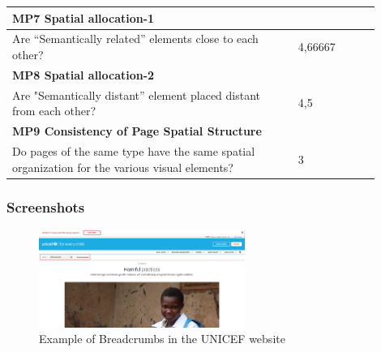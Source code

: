 \begin{longtable}{|p{0.7\linewidth}|p{0.2\linewidth}|}
\multicolumn{2}{|l|}{\textbf{MP7 Spatial allocation-1}} \\
\hline
Are “Semantically related” elements close to each other? & 4,66667  \\
\hline

\multicolumn{2}{|l|}{\textbf{MP8 Spatial allocation-2}} \\
\hline
Are "Semantically distant” element placed distant from each other? & 4,5  \\
\hline

\multicolumn{2}{|l|}{\textbf{MP9 Consistency of Page Spatial Structure}} \\
\hline
Do pages of the same type have the same spatial organization for the various visual elements? & 3  \\
\hline

\end{longtable}

\subsubsection{Screenshots}
\begin{figure}[h]
	\centering
	\includegraphics[width=0.6\textwidth]{img/critical_heuristics/N1.2.png}
	\caption{Example of Breadcrumbs in the UNICEF website}
	\label{fig:N1.2}
\end{figure}

